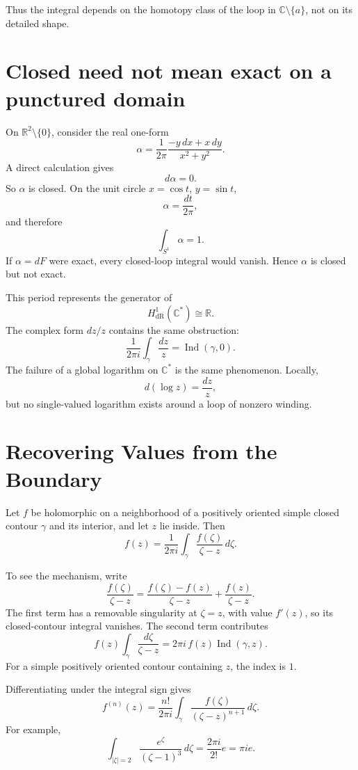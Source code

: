 Thus the integral depends on the homotopy class of the loop in \(\mathbb C\setminus\{a\}\), not on its detailed shape.

\section{Closed need not mean exact on a punctured domain}

On \(\mathbb R^2\setminus\{0\}\), consider the real one-form
\[
  \alpha
  =\frac{1}{2\pi}
  \frac{-y\,dx+x\,dy}{x^2+y^2}.
\]
A direct calculation gives
\[
  d\alpha=0.
\]
So \(\alpha\) is closed.  On the unit circle \(x=\cos t\), \(y=\sin t\),
\[
  \alpha=\frac{dt}{2\pi},
\]
and therefore
\[
  \int_{S^1}\alpha=1.
\]
If \(\alpha=dF\) were exact, every closed-loop integral would vanish.  Hence \(\alpha\) is closed but not exact.

This period represents the generator of
\[
  H^1_{\mathrm{dR}}(\mathbb C^*)\cong\mathbb R.
\]
The complex form \(dz/z\) contains the same obstruction:
\[
  \frac{1}{2\pi i}
  \int_\gamma\frac{dz}{z}
  =\operatorname{Ind}(\gamma,0).
\]
The failure of a global logarithm on \(\mathbb C^*\) is the same phenomenon.  Locally,
\[
  d(\log z)=\frac{dz}{z},
\]
but no single-valued logarithm exists around a loop of nonzero winding.

\section{Recovering Values from the Boundary}

Let \(f\) be holomorphic on a neighborhood of a positively oriented simple closed contour \(\gamma\) and its interior, and let \(z\) lie inside.  Then
\[
  \boxed{
  f(z)=\frac{1}{2\pi i}
  \int_\gamma
  \frac{f(\zeta)}{\zeta-z}\,d\zeta.}
\]

To see the mechanism, write
\[
  \frac{f(\zeta)}{\zeta-z}
  =\frac{f(\zeta)-f(z)}{\zeta-z}
  +\frac{f(z)}{\zeta-z}.
\]
The first term has a removable singularity at \(\zeta=z\), with value \(f'(z)\), so its closed-contour integral vanishes.  The second term contributes
\[
  f(z)\int_\gamma\frac{d\zeta}{\zeta-z}
  =2\pi i\,f(z)\operatorname{Ind}(\gamma,z).
\]
For a simple positively oriented contour containing \(z\), the index is \(1\).

Differentiating under the integral sign gives
\[
  f^{(n)}(z)
  =\frac{n!}{2\pi i}
  \int_\gamma
  \frac{f(\zeta)}{(\zeta-z)^{n+1}}\,d\zeta.
\]
For example,
\[
  \int_{|\zeta|=2}
  \frac{e^\zeta}{(\zeta-1)^3}\,d\zeta
  =\frac{2\pi i}{2!}e
  =\pi i e.
\]

